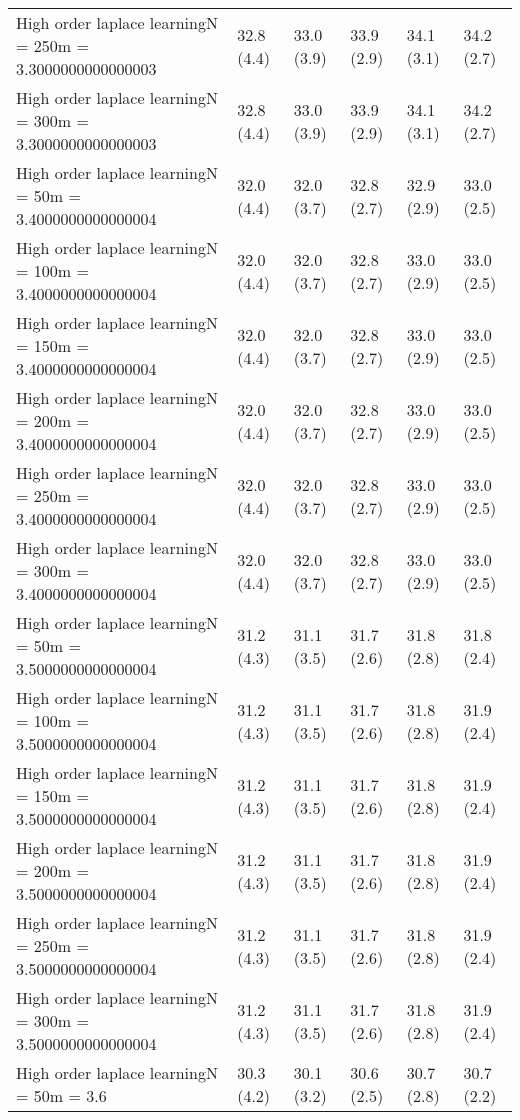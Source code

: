 \documentclass{article}
\begin{document}
\begin{table*}[t!]
\begin{center}
\begin{small}
\begin{sc}
\begin{tabular}{llllll}
High order laplace learningN = 250m = 3.3000000000000003&32.8 (4.4)      &33.0 (3.9)      &33.9 (2.9)      &34.1 (3.1)      &34.2 (2.7)      \\
High order laplace learningN = 300m = 3.3000000000000003&32.8 (4.4)      &33.0 (3.9)      &33.9 (2.9)      &34.1 (3.1)      &34.2 (2.7)      \\
High order laplace learningN = 50m = 3.4000000000000004&32.0 (4.4)      &32.0 (3.7)      &32.8 (2.7)      &32.9 (2.9)      &33.0 (2.5)      \\
High order laplace learningN = 100m = 3.4000000000000004&32.0 (4.4)      &32.0 (3.7)      &32.8 (2.7)      &33.0 (2.9)      &33.0 (2.5)      \\
High order laplace learningN = 150m = 3.4000000000000004&32.0 (4.4)      &32.0 (3.7)      &32.8 (2.7)      &33.0 (2.9)      &33.0 (2.5)      \\
High order laplace learningN = 200m = 3.4000000000000004&32.0 (4.4)      &32.0 (3.7)      &32.8 (2.7)      &33.0 (2.9)      &33.0 (2.5)      \\
High order laplace learningN = 250m = 3.4000000000000004&32.0 (4.4)      &32.0 (3.7)      &32.8 (2.7)      &33.0 (2.9)      &33.0 (2.5)      \\
High order laplace learningN = 300m = 3.4000000000000004&32.0 (4.4)      &32.0 (3.7)      &32.8 (2.7)      &33.0 (2.9)      &33.0 (2.5)      \\
High order laplace learningN = 50m = 3.5000000000000004&31.2 (4.3)      &31.1 (3.5)      &31.7 (2.6)      &31.8 (2.8)      &31.8 (2.4)      \\
High order laplace learningN = 100m = 3.5000000000000004&31.2 (4.3)      &31.1 (3.5)      &31.7 (2.6)      &31.8 (2.8)      &31.9 (2.4)      \\
High order laplace learningN = 150m = 3.5000000000000004&31.2 (4.3)      &31.1 (3.5)      &31.7 (2.6)      &31.8 (2.8)      &31.9 (2.4)      \\
High order laplace learningN = 200m = 3.5000000000000004&31.2 (4.3)      &31.1 (3.5)      &31.7 (2.6)      &31.8 (2.8)      &31.9 (2.4)      \\
High order laplace learningN = 250m = 3.5000000000000004&31.2 (4.3)      &31.1 (3.5)      &31.7 (2.6)      &31.8 (2.8)      &31.9 (2.4)      \\
High order laplace learningN = 300m = 3.5000000000000004&31.2 (4.3)      &31.1 (3.5)      &31.7 (2.6)      &31.8 (2.8)      &31.9 (2.4)      \\
High order laplace learningN = 50m = 3.6&30.3 (4.2)      &30.1 (3.2)      &30.6 (2.5)      &30.7 (2.8)      &30.7 (2.2)      \\

\end{tabular}
\end{sc}
\end{small}
\end{center}
\end{table*}
\end{document}
